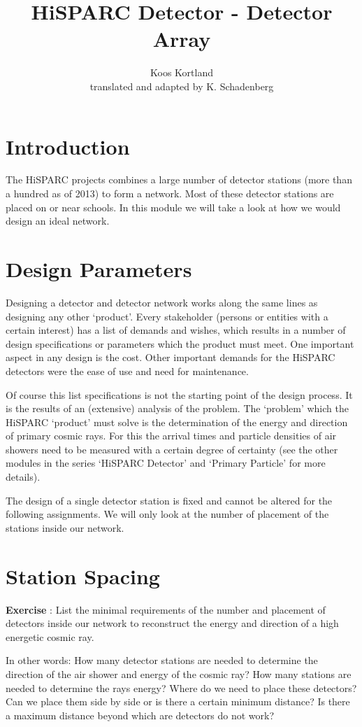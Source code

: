 



\author{Koos Kortland \\ translated and adapted by K. Schadenberg}
\date{}
\title{HiSPARC Detector - Detector Array}


\maketitle

\section{Introduction}
The HiSPARC projects combines a large number of detector stations (more than a hundred as of 2013) to form a network. Most of these detector stations are placed on or near schools. In this module we will take a look at how we would design an ideal network.

\section{Design Parameters}
Designing a detector and detector network works along the same lines as designing any other `product'. Every stakeholder (persons or entities with a certain interest) has a list of demands and wishes, which results in a number of design specifications or parameters which the product must meet. One important aspect in any design is the cost. Other important demands for the HiSPARC detectors were the ease of use and need for maintenance.

Of course this list specifications is not the starting point of the design process. It is the results of an (extensive) analysis of the problem. The `problem' which the HiSPARC `product' must solve is the determination of the energy and direction of primary cosmic rays. For this the arrival times and particle densities of air showers need to be measured with a certain degree of certainty (see the other modules in the series `HiSPARC Detector' and `Primary Particle' for more details).

The design of a single detector station is fixed and cannot be altered for the following assignments. We will only look at the number of placement of the stations inside our network.

\section{Station Spacing}
\begin{shaded}
\textbf{Exercise \theExercise {}} : List the minimal requirements of the number and placement of detectors inside our network to reconstruct the energy and direction of a high energetic cosmic ray.

In other words: How many detector stations are needed to determine the direction of the air shower and energy of the cosmic ray? How many stations are needed to determine the rays energy? Where do we need to place these detectors? Can we place them side by side or is there a certain minimum distance? Is there a maximum distance beyond which are detectors do not work?\end{shaded}

